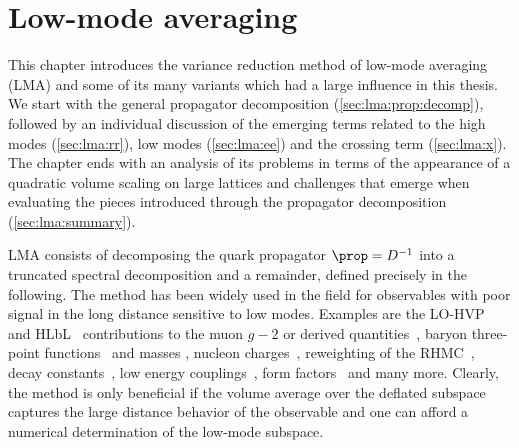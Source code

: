 \chapter{Low-mode averaging}
\label{ch:p2:lma}




This chapter introduces the variance reduction method of low-mode averaging~\cite{Neff_2001,DeGrand_2004,Giusti_2004} (LMA) and some of its many variants which had a large influence in this thesis.
We start with the general propagator decomposition (\cref{sec:lma:prop:decomp}), followed by an individual discussion of the emerging terms related to the high modes (\cref{sec:lma:rr}), low modes (\cref{sec:lma:ee}) and the crossing term (\cref{sec:lma:x}).
The chapter ends with an analysis of its problems in terms of the appearance of a quadratic volume scaling on large lattices and challenges that emerge when evaluating the pieces introduced through the propagator decomposition (\cref{sec:lma:summary}).


LMA consists of decomposing the quark propagator $\prop=D^{-1}$ into a truncated spectral decomposition and a remainder, defined precisely in the following.
The method has been widely used in the field for observables with poor signal in the long distance sensitive to low modes.
Examples are the LO-HVP~\cite{bmw_2024,Kuberski_2023,Aubin:2022hgm,Bazavov:2024eou,RBC_2024} and HLbL~\cite{Lin:2024khg} contributions to the muon $g-2$ or derived quantities~\cite{ExtendedTwistedMass:2025tpc}, baryon three-point functions~\cite{Yang:2015zja,Ohki:2012jyg} and masses \cite{Bali:2010se}, nucleon charges~\cite{Yamanaka:2018uud}, reweighting of the RHMC~\cite{Kuberski:2023zky}, decay constants~\cite{Bali:2014pva}, low energy couplings~\cite{Bernardoni:2011kd}, form factors~\cite{JLQCD:2009ofg} and many more.
Clearly, the method is only beneficial if the volume average over the deflated subspace captures the large distance behavior of the observable and one can afford a numerical determination of the low-mode subspace.

